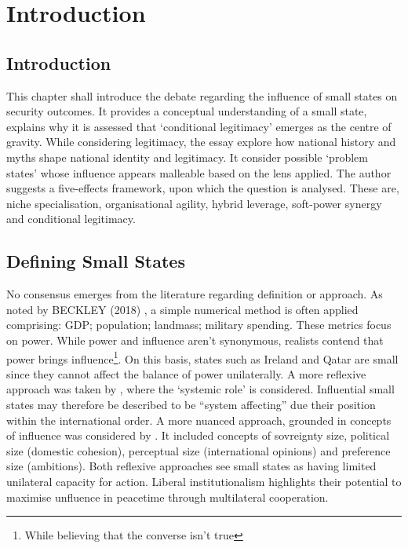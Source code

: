 
\chapter{Introduction}

\section*{Introduction}
This chapter shall introduce the debate regarding the influence of small states on security outcomes. It provides a conceptual understanding of a small state, explains why it is assessed that `conditional legitimacy' emerges as the centre of gravity. While considering legitimacy, the essay explore how national history and myths shape national identity and legitimacy. It consider possible `problem states' whose influence appears malleable based on the lens applied. The author suggests a five-effects framework, upon which the question is analysed. These are, niche specialisation, organisational agility, hybrid leverage, soft-power synergy and conditional legitimacy. 


\section*{Defining Small States}
No consensus emerges from the literature regarding definition or approach. As noted by BECKLEY (2018) \nocite{BECKLEY_2018}, a simple numerical method is often applied comprising: GDP; population; landmass; military spending. These metrics focus on power. While power and influence aren't synonymous, realists contend that power brings influence\footnote{While believing that the converse isn't true}. On this basis, states such as Ireland  and Qatar are small since they cannot affect the balance of power unilaterally. A more reflexive approach was taken by \textcite{KEOHANE_1969}, where the `systemic role' is considered. Influential small states may therefore be described to be ``system affecting'' due their position within the international order. A more nuanced approach, grounded in concepts of influence was considered by \textcite{THORHALLSSON_2006}. It included concepts of sovreignty size, political size (domestic cohesion), perceptual size (international opinions) and preference size (ambitions). Both reflexive approaches see small states as having limited unilateral capacity for action. Liberal institutionalism highlights their potential to maximise unfluence in peacetime through multilateral cooperation.







